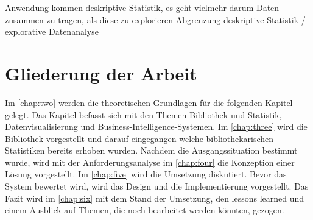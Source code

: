 Anwendung kommen deskriptive Statistik, es geht vielmehr darum Daten zusammen zu tragen, als diese zu explorieren 
Abgrenzung deskriptive Statistik / explorative Datenanalyse

\section{Gliederung der Arbeit}
Im \autoref{chap:two} werden die theoretischen Grundlagen für die folgenden Kapitel gelegt. Das Kapitel befasst
sich mit den Themen Bibliothek und Statistik, Datenvisualisierung und Business-Intelligence-Systemen. Im \autoref{chap:three}
wird die Bibliothek vorgestellt und darauf eingegangen welche bibliothekarischen Statistiken bereits erhoben wurden.
Nachdem die Ausgangssituation bestimmt wurde, wird mit der Anforderungsanalyse im \autoref{chap:four} die Konzeption einer Lösung vorgestellt.
Im \autoref{chap:five} wird die Umsetzung diskutiert. Bevor das System bewertet wird, wird das Design und die Implementierung vorgestellt.
Das Fazit wird im \autoref{chap:six} mit dem Stand der Umsetzung, den lessons learned und einem Ausblick auf Themen, die noch bearbeitet werden könnten, gezogen.
